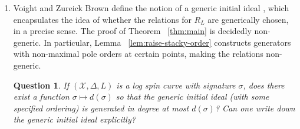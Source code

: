 \documentclass{amsart}
\theoremstyle{plain}
\newtheorem{question}[thm]{Question}
\theoremstyle{definition}
\theoremstyle{remark}
\numberwithin{equation}{section}
\newcommand\sx{\mathscr X}
\newcommand{\halfcan}{L}
\begin{document}
\begin{enumerate}
	\item Voight and Zureick Brown define
		the notion of a generic initial ideal \cite[Definition 2.2.7]{vzb:stacky}, which 
		encapsulates the idea of whether the relations for $R_\halfcan$ are 
		generically chosen, in a precise sense. 
		The proof of Theorem
		~\ref{thm:main} is decidedly non-generic. 
		In particular, Lemma ~\ref{lem:raise-stacky-order} 
		constructs generators with non-maximal pole orders at certain 
		points, making the relations non-generic. 
		\begin{question}
		\label{ques:generic-initial}
			If $(\sx,\Delta,L)$ is a log spin curve with signature $\sigma$,
			does there exist a function $\sigma \mapsto d(\sigma)$ so that
			the generic initial ideal {\rm(}with some specified ordering{\rm)}
			is generated in degree at most $d(\sigma)$? Can one write down the
			generic initial ideal explicitly?
		\end{question}


\end{enumerate}
\end{document}
